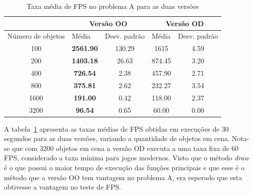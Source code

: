 \begin{table}[h!]
\centering
\caption{Taxa média de FPS no problema A para as duas versões}
\label{fpsv1table}
\begin{tabular}{c|cc|cc}
\cline{2-5}
                                       & \multicolumn{2}{c|}{Versão OO}                                & \multicolumn{2}{c}{Versão OD}                                \\ \hline
\multicolumn{1}{l|}{Número de objetos} & \multicolumn{1}{l}{Média} & \multicolumn{1}{l|}{Desv. padrão} & \multicolumn{1}{l}{Média} & \multicolumn{1}{l}{Desv. padrão} \\ \hline
100                                    & \textbf{2561.90}          & 130.29                            & 1615                      & 4.59                             \\ \hline
200                                    & \textbf{1403.18}          & 26.63                             & 874.45                    & 3.20                             \\ \hline
400                                    & \textbf{726.54}           & 2.38                              & 457.90                    & 2.71                             \\ \hline
800                                    & \textbf{375.81}           & 2.62                              & 232.27                    & 3.54                             \\ \hline
1600                                   & \textbf{191.00}           & 0.42                              & 118.00                    & 2.37                             \\ \hline
3200                                   & \textbf{96.54}            & 0.65                              & 60.00                     & 0.00                             \\ \hline
\end{tabular}
\end{table}

A tabela~\ref{fpsv1table} apresenta as taxas médias de FPS obtidas em execuções 
de 30 segundos para as duas versões, variando a quantidade de objetos em cena. 
Nota-se que com 3200 objetos em cena a versão OD executa a uma taxa fixa de 
60 FPS, considerado a taxa mínima para jogos modernos. Visto que o método 
\textit{draw} é o que possui o maior tempo de execução das funções principais e 
que esse é o método que a versão OO tem vantagem no problema A, era esperado 
que esta obtivesse a vantagem no teste de FPS.

